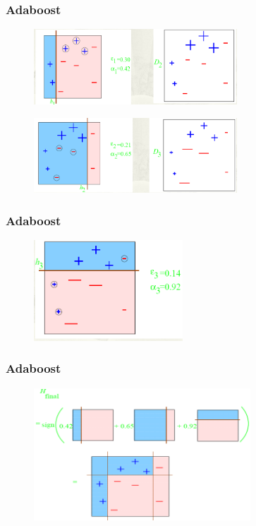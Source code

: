 \documentclass[10pt]{beamer}
\begin{document}
\begin{frame}
    \frametitle{Adaboost}
   \begin{figure}[!ht]
   \centering
   \includegraphics[width=3.0in]{AAUgraphics/ada2.png}
   \end{figure}
   \begin{figure}[!ht]
   \centering
   \includegraphics[width=3.0in]{AAUgraphics/ada3.png}
   \end{figure}
\end{frame}


\begin{frame}
    \frametitle{Adaboost}
   \begin{figure}[!ht]
   \centering
   \includegraphics[width=2.2in]{AAUgraphics/ada4.png}
   \end{figure}
\end{frame}

\begin{frame}
    \frametitle{Adaboost}
   \begin{figure}[!ht]
   \centering
   \includegraphics[width=3.2in]{AAUgraphics/ada5.png}
   \end{figure}
\end{frame}
\end{document}
